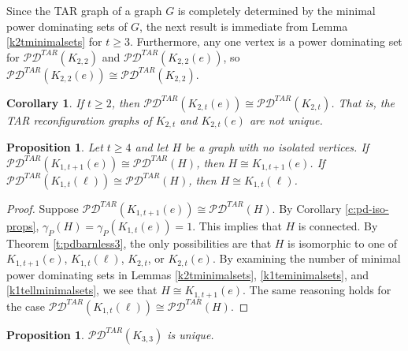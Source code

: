 \documentclass{article}
\numberwithin{figure}{section}   %
\newtheorem{cor}[thm]{Corollary}
\newtheorem{prop}[thm]{Proposition}
\theoremstyle{definition}
\theoremstyle{definition}
\theoremstyle{definition}
\newcommand{\pd}{\gamma_P}
\newcommand{\tar}{\mathscr{PD}^{TAR}}
\newcommand{\bj}[1]{{\textcolor{red}{[}\textcolor{red}{{BJ: \em #1}]}}}
\begin{document}
Since the TAR graph of a graph $G$ is completely determined by the minimal power dominating sets of $G$, the next result is immediate from Lemma \ref{k2tminimalsets} for $t\ge 3$.  Furthermore, any one vertex is a power dominating set for $ \tar(K_{2,2})$ and $\tar(K_{2,2}(e))$, so $\tar(K_{2,2}(e)) \cong \tar(K_{2,2})$.

\begin{cor}
\label{mPDS:n-3:K2t}
If $t \geq 2$, then  $\tar(K_{2,t}(e)) \cong \tar(K_{2,t})$.  That is, the TAR reconfiguration graphs of $K_{2,t}$ and $K_{2,t}(e)$ are not unique.
\end{cor}




\begin{prop}
\label{mPDS:n-3:K1t} Let $t \geq 4$ and let $H$ be a graph with no isolated vertices. %
If   $\tar(K_{1,t+1}(e)) \cong \tar(H)$, then $H \cong K_{1,t+1}(e)$.  If  $\tar(K_{1,t}(\ell)) \cong \tar(H)$, then $H \cong K_{1,t}(\ell)$. 
\end{prop}


\begin{proof}
Suppose $\tar(K_{1,t+1}(e)) \cong \tar(H)$.  By Corollary \ref{c:pd-iso-props}, $\pd(H)=\pd(K_{1,t}(e))=1$.  This implies  that $H$ is connected.  
By Theorem \ref{t:pdbarnless3}, the only possibilities are that $H$ is isomorphic to one of  $K_{1,t+1}(e)$, $K_{1,t}(\ell)$, $K_{2,t}$, or $K_{2,t}(e)$.  By examining the number of minimal power dominating sets in Lemmas \ref{k2tminimalsets}, \ref{k1teminimalsets}, and  \ref{k1tellminimalsets}, we see that $H \cong K_{1,t+1}(e)$.  The same reasoning holds for the case $\tar(K_{1,t}(\ell)) \cong \tar(H)$. 
\end{proof}





\begin{prop}\label{p:K33} $\tar(K_{3,3})$ is   unique. 
\end{prop}
\end{document}
